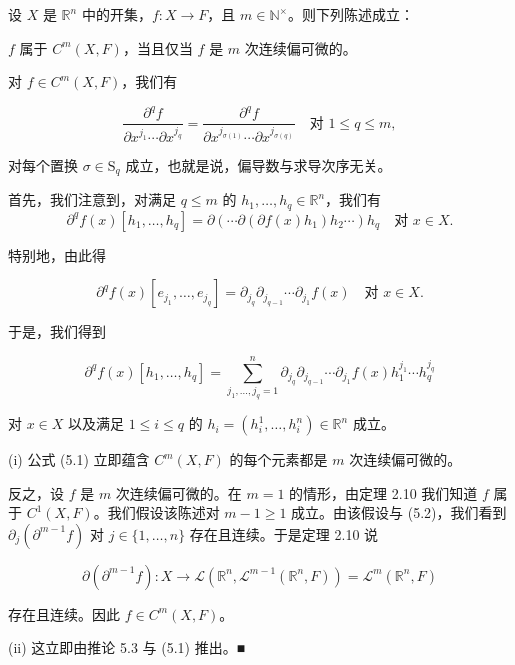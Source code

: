 \begin{theorem}

设 $ X $ 是 $ \mathbb{R}^{n} $ 中的开集，$ f : X \to F $，且 $ m \in \mathbb{N}^{\times} $。则下列陈述成立：

\begin{subitems}
\item

$ f $ 属于 $ C^{m}(X, F) $，当且仅当 $ f $ 是 $ m $ 次连续偏可微的。

\item

对 $ f \in C^{m}(X, F) $，我们有

\[
\frac{\partial^{q}f}{\partial x^{j_{1}}\cdots\partial x^{j_{q}}} = \frac{\partial^{q}f}{\partial x^{j_{\sigma(1)}}\cdots\partial x^{j_{\sigma(q)}}} \quad \text{对 } 1 \le q \le m ,
\]

对每个置换 $ \sigma \in \mathrm{S}_{q} $ 成立，也就是说，偏导数与求导次序无关。

\proofhead
首先，我们注意到，对满足 $ q \le m $ 的 $ h_{1}, \ldots, h_{q} \in \mathbb{R}^{n} $，我们有
\[
\partial^{q}f(x)[h_{1}, \ldots, h_{q}] = \partial(\cdots\partial(\partial f(x)h_{1})h_{2}\cdots)h_{q} \quad \text{对 } x \in X .
\]

特别地，由此得

\begin{equation}
\partial^{q}f(x)[e_{j_{1}}, \ldots, e_{j_{q}}] = \partial_{j_{q}}\partial_{j_{q-1}}\cdots\partial_{j_{1}}f(x) \quad \text{对 } x \in X .\tag{5.1}
\end{equation}

于是，我们得到

\begin{equation}
\partial^{q}f(x)[h_{1}, \ldots, h_{q}] = \sum_{j_{1},\ldots,j_{q}=1}^{n}\partial_{j_{q}}\partial_{j_{q-1}}\cdots\partial_{j_{1}}f(x)h_{1}^{j_{1}}\cdots h_{q}^{j_{q}}\tag{5.2}
\end{equation}

对 $ x \in X $ 以及满足 $ 1 \le i \le q $ 的 $ h_{i} = (h_{i}^{1}, \ldots, h_{i}^{n}) \in \mathbb{R}^{n} $ 成立。

\end{subitems}

(i) 公式 (5.1) 立即蕴含 $ C^{m}(X, F) $ 的每个元素都是 $ m $ 次连续偏可微的。

反之，设 $ f $ 是 $ m $ 次连续偏可微的。在 $ m = 1 $ 的情形，由定理 2.10 我们知道 $ f $ 属于 $ C^{1}(X, F) $。我们假设该陈述对 $ m-1 \ge 1 $ 成立。由该假设与 (5.2)，我们看到 $ \partial_{j}(\partial^{m-1}f) $ 对 $ j \in \{1, \ldots, n\} $ 存在且连续。于是定理 2.10 说

\[
\partial(\partial^{m-1}f) : X \to \mathcal{L}\left( \mathbb{R}^{n}, \mathcal{L}^{m-1}(\mathbb{R}^{n}, F) \right) = \mathcal{L}^{m}(\mathbb{R}^{n}, F)
\]

存在且连续。因此 $ f \in C^{m}(X, F) $。

(ii) 这立即由推论 5.3 与 (5.1) 推出。\nobreak\hspace{0.35em}■

\end{theorem}
